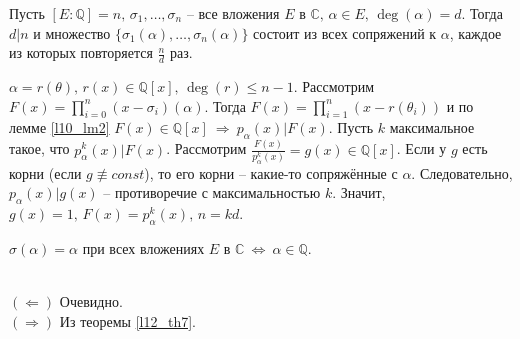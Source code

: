 \begin{theorem} \label{l12_th7}
	Пусть $[E \colon \mathbb{Q}] = n, \, \sigma_1,\dots,\sigma_n$ -- все вложения $E$ в $\mathbb{C}, \, \alpha \in E, \, \deg(\alpha) = d$. Тогда $d \vert n$ и множество $\{ \sigma_1(\alpha),\dots,\sigma_n(\alpha) \}$ состоит из всех сопряжений к $\alpha$, каждое из которых повторяется $\displaystyle \frac{n}{d}$ раз.
\end{theorem}
\begin{pf}
	$\alpha = r(\theta), \, r(x) \in \mathbb{Q}[x], \, \deg(r) \leq n-1$. 
	Рассмотрим $\displaystyle F(x) = \prod\limits_{i=0}^n (x-\sigma_i)(\alpha)$. Тогда $\displaystyle F(x) = \prod\limits_{i=1}^n (x-r(\theta_i))$ и по лемме \ref{l10_lm2} $F(x) \in \mathbb{Q}[x] \ \Rightarrow \ p_\alpha(x) \vert F(x)$. 
	Пусть $k$ максимальное такое, что $p_\alpha^k(x) \vert F(x)$. Рассмотрим $\displaystyle \frac{F(x)}{p_\alpha^k(x)} = g(x) \in \mathbb{Q}[x]$. 
	Если у $g$ есть корни (если $g \not\equiv const$), то его корни -- какие-то сопряжённые с $\alpha$. Следовательно, $p_\alpha(x) \vert g(x)$ -- противоречие с максимальностью $k$. 
	Значит, $g(x)=1,\,F(x)=p_\alpha^k(x),\,n=kd$.
\end{pf}

\begin{corollary}
	$\sigma(\alpha) = \alpha$ при всех вложениях $E$ в $\mathbb{C} \ \Leftrightarrow \ \alpha \in \mathbb{Q}$.
\end{corollary}
\begin{pf}~\\
	$(\Leftarrow)$ Очевидно.\\
	$(\Rightarrow)$ Из теоремы \ref{l12_th7}.
\end{pf}